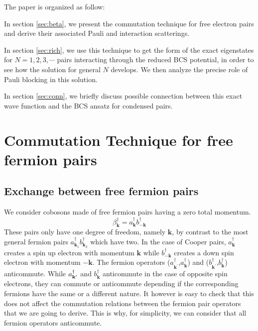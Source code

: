 \documentclass[aps,prb,superscriptaddress,twocolumn]{revtex4}
\newcommand{\vk}{\ensuremath{\mathbf{k}}}
\begin{document}
The paper is organized as follow:

In section \ref{sec:beta}, we present the commutation technique for free
electron pairs and derive their associated Pauli and interaction scatterings.

In section \ref{sec:rich}, we use this technique to get the form of the
exact eigenstates for $N=1,2,3,\cdots$ pairs interacting through the reduced
BCS potential, in order to see how the solution for general $N$ develops. We
then analyze the precise role of Pauli blocking in this solution.

In section \ref{sec:conn}, we briefly discuss possible connection between this exact
wave function and the BCS ansatz for condensed pairs.

\section{Commutation Technique for free fermion pairs\label{sec:beta}}

\subsection{Exchange between free fermion pairs}

We consider cobosons made of free fermion pairs having a zero total
momentum. 
\begin{equation}
\beta^{\dagger}_\vk=a^{\dagger}_{\mathbf{k} }b^{\dagger}_{-\mathbf{k} }
\end{equation}
These pairs only have one degree of freedom, namely $\mathbf{k}$, by contrast to the
most general fermion pairs $a^{\dagger}_{\mathbf{k} _1}b^{\dagger}_{\mathbf{k%
} _2}$ which have two. In the case of Cooper pairs, $a^{\dagger}_{\mathbf{k} }$ creates a spin up electron with momentum $\mathbf{k}$ while $b^{\dagger}_{\mathbf{-k} }$ creates a down spin electron with momentum $\mathbf{-k}$. The fermion operators ($a^{\dagger}_{\mathbf{k}
^{\prime}}$,$a^{\dagger}_{\mathbf{k} }$) and ($b^{\dagger}_{\mathbf{k}
^{\prime}}$,$b^{\dagger}_{\mathbf{k} }$) anticommute. While $a^{\dagger}_{%
\mathbf{k} ^{\prime}}$ and $b^{\dagger}_{\mathbf{k} }$
anticommute in the case of opposite spin electrons, they can commute or anticommute depending if the corresponding fermions have the same or a different
nature. It however is easy to check that this does not affect the commutation
relations between the fermion pair operators that we are going to derive. This is why, for simplicity, we can consider that all fermion operators anticommute. 
\end{document}
